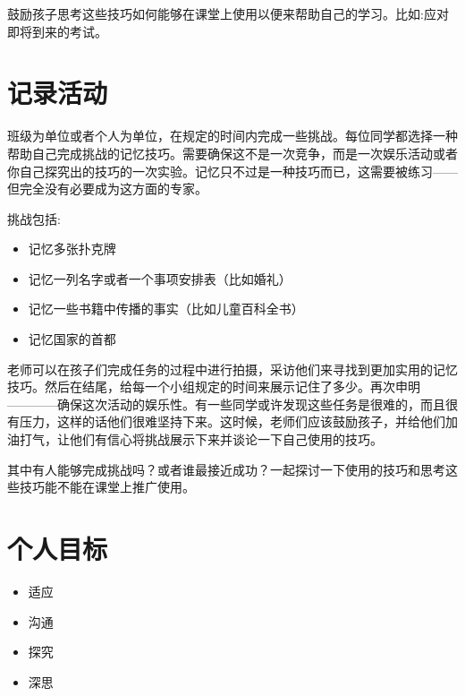    鼓励孩子思考这些技巧如何能够在课堂上使用以便来帮助自己的学习。比如:应对即将到来的考试。\par

\section{记录活动}
    班级为单位或者个人为单位，在规定的时间内完成一些挑战。每位同学都选择一种帮助自己完成挑战的记忆技巧。需要确保这不是一次竞争，而是一次娱乐活动或者你自己探究出的技巧的一次实验。记忆只不过是一种技巧而已，这需要被练习——但完全没有必要成为这方面的专家。\par
    挑战包括:\par
    \begin{itemize}
      \item 记忆多张扑克牌
      \item 记忆一列名字或者一个事项安排表（比如婚礼）
      \item 记忆一些书籍中传播的事实（比如儿童百科全书）
      \item 记忆国家的首都 
    \end{itemize}  
    老师可以在孩子们完成任务的过程中进行拍摄，采访他们来寻找到更加实用的记忆技巧。然后在结尾，给每一个小组规定的时间来展示记住了多少。再次申明————确保这次活动的娱乐性。有一些同学或许发现这些任务是很难的，而且很有压力，这样的话他们很难坚持下来。这时候，老师们应该鼓励孩子，并给他们加油打气，让他们有信心将挑战展示下来并谈论一下自己使用的技巧。\par
    其中有人能够完成挑战吗？或者谁最接近成功？一起探讨一下使用的技巧和思考这些技巧能不能在课堂上推广使用。\par

\section{个人目标}
   \begin{itemize}
     \item 适应
     \item 沟通
     \item 探究 
     \item 深思  
   \end{itemize}  
